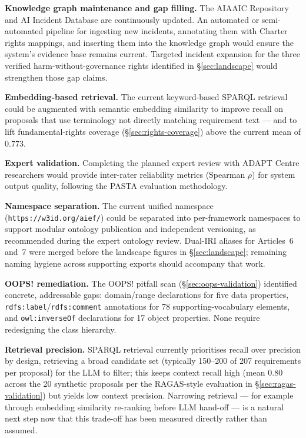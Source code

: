 \textbf{Knowledge graph maintenance and gap filling.} The AIAAIC Repository and AI Incident Database are continuously updated. An automated or semi-automated pipeline for ingesting new incidents, annotating them with Charter rights mappings, and inserting them into the knowledge graph would ensure the system's evidence base remains current. Targeted incident expansion for the three verified harm-without-governance rights identified in \S\ref{sec:landscape} would strengthen those gap claims.

\textbf{Embedding-based retrieval.} The current keyword-based SPARQL retrieval could be augmented with semantic embedding similarity to improve recall on proposals that use terminology not directly matching requirement text --- and to lift fundamental-rights coverage (\S\ref{sec:rights-coverage}) above the current mean of 0.773.

\textbf{Expert validation.} Completing the planned expert review with ADAPT Centre researchers would provide inter-rater reliability metrics (Spearman $\rho$) for system output quality, following the PASTA \cite{pasta2026} evaluation methodology.

\textbf{Namespace separation.} The current unified namespace (\texttt{https://w3id.org/aief/}) could be separated into per-framework namespaces to support modular ontology publication and independent versioning, as recommended during the expert ontology review. Dual-IRI aliases for Articles~6 and~7 were merged before the landscape figures in \S\ref{sec:landscape}; remaining naming hygiene across supporting exports should accompany that work.

\textbf{OOPS! remediation.} The OOPS! pitfall scan (\S\ref{sec:oops-validation}) identified concrete, addressable gaps: domain/range declarations for five data properties, \texttt{rdfs:label}/\texttt{rdfs:comment} annotations for 78 supporting-vocabulary elements, and \texttt{owl:inverseOf} declarations for 17 object properties. None require redesigning the class hierarchy.

\textbf{Retrieval precision.} SPARQL retrieval currently prioritises recall over precision by design, retrieving a broad candidate set (typically 150--200 of 207 requirements per proposal) for the LLM to filter; this keeps context recall high (mean 0.80 across the 20 synthetic proposals per the RAGAS-style evaluation in \S\ref{sec:ragas-validation}) but yields low context precision. Narrowing retrieval — for example through embedding similarity re-ranking before LLM hand-off — is a natural next step now that this trade-off has been measured directly rather than assumed.

